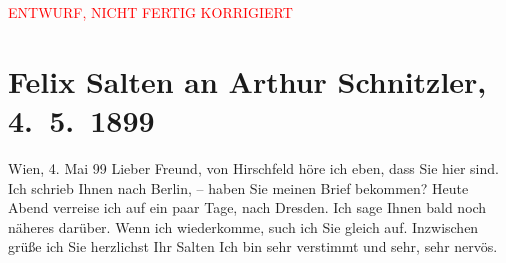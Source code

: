 
\begin{center}
            \textcolor{red}{ENTWURF, NICHT FERTIG KORRIGIERT}
                      \end{center}
            
         
         \renewcommand{\erwaehntePersonen}{Personen: Georg Hirschfeld}
         \renewcommand{\erwaehnteOrte}{Orte: Berlin, Dresden, Wien}
         \renewcommand{\erwaehnteWerke}{}
               \section[Felix Salten an Arthur Schnitzler, 4. 5. 1899]{ Felix Salten an Arthur Schnitzler, 4. 5. 1899}\nopagebreak{}\rehead{ }\begin{ledgroupsized}[t]{13cm}\normalsize\beginnumbering \toendnotes[C]{\smallbreak\pagebreak[2]} 
\pstart
           \raggedleft{}{\pb}Wien, 4. Mai 99\pend
           \pstart
           Lieber Freund, von Hirschfeld
               höre ich eben, dass Sie hier sind. Ich schrieb Ihnen nach Berlin, – haben Sie meinen Brief bekommen? Heute
               Abend verreise ich auf ein paar Tage, nach Dresden. Ich sage Ihnen bald noch näheres darüber. Wenn ich wiederkomme,
               such ich Sie gleich auf. Inzwischen grüße ich Sie herzlichst \pend
           \pstart  Ihr \spacefill\mbox{Salten}\pend{}\pstart
           \noindent{}Ich bin sehr verstimmt und sehr, sehr nervös.\pend
           
         
         \endnumbering{}\end{ledgroupsized}\begin{anhang}\end{anhang}\newcommand{\dateiname}{L03290}\newcommand{\titel}{Felix Salten an Arthur Schnitzler, 4. 5. 1899}\newcommand{\editorInnen}{Martin Anton Müller und Laura Untner}
      